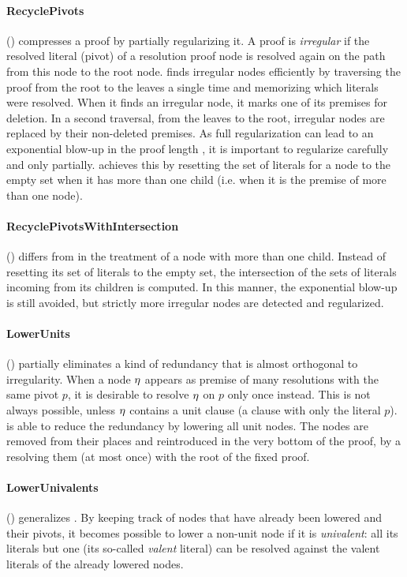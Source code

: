 \documentclass{llncs}
\begin{document}
\paragraph{RecyclePivots} () \cite{RP08,RP11} compresses a proof by partially regularizing it. A proof is \emph{irregular} \cite{Tseitin} if the resolved literal (pivot) of a resolution proof node is resolved again on the path from this node to the root node.  finds irregular nodes efficiently by traversing the proof from the root to the leaves a single time and memorizing which literals were resolved. When it finds an irregular node, it marks one of its premises for deletion. In a second traversal, from the leaves to the root, irregular nodes are replaced by their non-deleted premises. As full regularization can lead to an exponential blow-up in the proof length \cite{Goerdt}, it is important to regularize carefully and only partially.  achieves this by resetting the set of literals for a node to the empty set when it has more than one child (i.e. when it is the premise of more than one node).


\paragraph{RecyclePivotsWithIntersection} () \cite{LURPI}
differs from  in the treatment of a node with more than one child. Instead of resetting its set of literals to the empty set, the intersection of the sets of literals incoming from its children is computed. In this manner, the exponential blow-up is still avoided, but strictly more irregular nodes are detected and regularized.


\paragraph{LowerUnits} () \cite{LURPI} partially eliminates a kind of redundancy that is almost orthogonal to irregularity. When a node $\eta$ appears as premise of many resolutions
with the same pivot $p$, it is desirable to resolve $\eta$ on $p$ only once instead. This is not always possible, unless $\eta$ contains a unit clause (a clause with only the literal $p$).
 is able to reduce the redundancy by lowering all unit nodes. The nodes are removed from their places and reintroduced in the very bottom of the proof, by a resolving them (at most once) with the root of the fixed proof. 


\paragraph{LowerUnivalents} () \cite{LUniv} generalizes . By
keeping track of nodes that have already been lowered and their pivots, it becomes
possible to lower a non-unit node if it is \emph{univalent}: all its literals but one (its so-called \emph{valent} literal) can be resolved against the valent literals of the already lowered nodes. 
\end{document}
